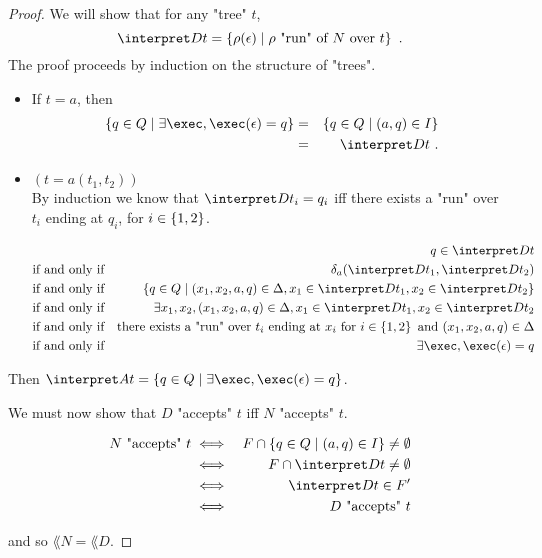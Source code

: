 \documentclass{article}
\begin{document}
\begin{proof}
	We will show that for any "tree" $t$,
	\[
		\interpret D t = \setdef {\rho(\epsilon)}{\text{$\rho$ "run" of~$N$ over~$t$}}\ .
	\]
	The proof proceeds by induction on the structure of "trees".
	\begin{itemize}
		\item If $t = a$, then
		      \begin{eqnarray*}
			      \setdef {q \in Q} {\exists \exec, \exec (\epsilon) = q} &=&  \setdef {q \in Q} {(a,q) \in I} \\
			      &=& \interpret D t\ .
		      \end{eqnarray*}
		\item $(t = a(t_1,t_2))$\\
		      By induction we know that
		      $\interpret D {t_i} = q_i$ iff there exists a "run" over $t_i$ ending at $q_i$, for $i \in \left\{1,2\right\}$.

		      \begin{eqnarray*}
			      &&q \in \interpret D t \\
			      &\text{if and only if}& \delta_a (\interpret D {t_1}, \interpret D {t_2}) \\
			      &\text{if and only if}& \setdef {q \in  Q} {(x_1,x_2,a,q) \in \Delta, x_1 \in \interpret D {t_1}, x_2 \in \interpret D {t_2}} \\
			      &\text{if and only if}& \exists x_1,x_2, (x_1,x_2,a,q) \in \Delta, x_1 \in \interpret D {t_1}, x_2 \in \interpret D {t_2} \\
			      &\text{if and only if}& \text{there exists a "run" over }  t_i  \text { ending at } x_i \text { for  } i \in \set {1,2} \text{ and } (x_1,x_2,a,q) \in \Delta\\
			      &\text{if and only if}& \exists \exec, \exec (\epsilon) = q
		      \end{eqnarray*}
	\end{itemize}
	Then $ \interpret A t = \setdef {q \in Q} {\exists \exec, \exec (\epsilon) = q} $.

	We must now show that $D$ "accepts" $t$ iff $N$ "accepts" $t$.

	\begin{eqnarray*}
		N \text{ "accepts" } t &\iff& F \cap \setdef {q \in Q} {(a,q) \in I} \neq \emptyset \\
		&\iff&   F \cap  \interpret D t \neq \emptyset \\
		&\iff& \interpret D t  \in F' \\
		&\iff& D \text{ "accepts" } t
	\end{eqnarray*}

	and so $\lang N = \lang D$.

\end{proof}
\end{document}
